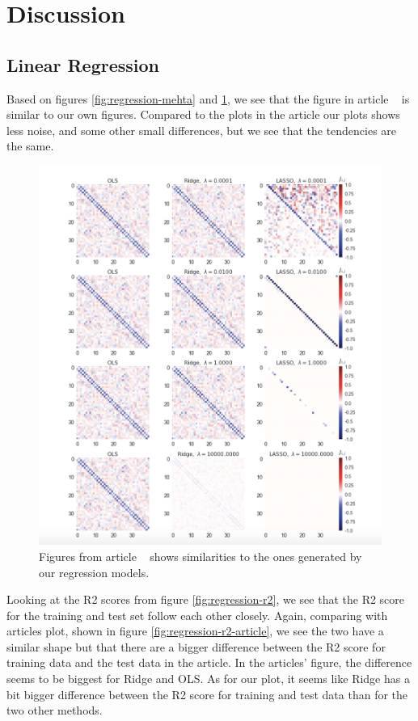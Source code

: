 \section{Discussion}
\subsection{Linear Regression}
Based on figures \ref{fig:regression-mehta} and 
\ref{fig:regression-mehta-article}, we see that the figure in article 
~\cite{HighBias} is similar to our own figures. 
Compared to the plots in the article our plots shows less noise, 
and some other small differences, but we see that the tendencies are the same.

\begin{figure}[H]
    \centering
\includegraphics[width = 0.7\paperwidth]{figures/Regression_metha_article.png} 
\caption{Figures from article ~\cite{HighBias} shows similarities to the ones generated by our regression models.} 
\label{fig:regression-mehta-article}
\end{figure}

Looking at the R2 scores from figure \ref{fig:regression-r2}, we see 
that the R2 score for the training and test set follow each other closely. 
Again, comparing with articles plot, shown in figure 
\ref{fig:regression-r2-article}, we see the two have a similar shape 
but that there are a bigger difference between the R2 score for training 
data and the test data in the article. 
In the articles' figure, the difference seems to be biggest for Ridge and 
OLS. As for our plot, it seems like Ridge has a bit bigger difference 
between the R2 score for training and test data than for the two other 
methods.

